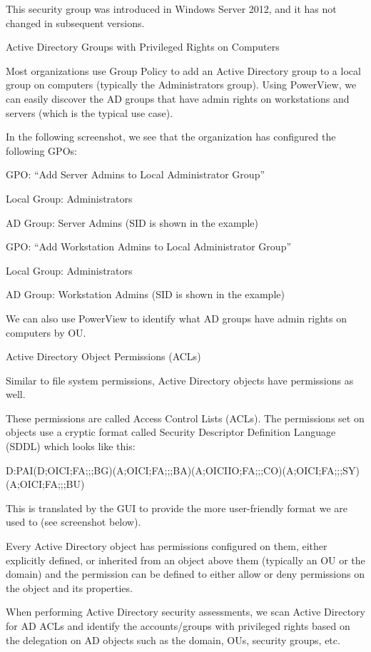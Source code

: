This security group was introduced in Windows Server 2012, and it has not changed in subsequent versions.

Active Directory Groups with Privileged Rights on Computers

Most organizations use Group Policy to add an Active Directory group to a local group on computers (typically the Administrators group). Using PowerView, we can easily discover the AD groups that have admin rights on workstations and servers (which is the typical use case).

In the following screenshot, we see that the organization has configured the following GPOs:

GPO: “Add Server Admins to Local Administrator Group”

Local Group: Administrators

AD Group: Server Admins (SID is shown in the example)

GPO: “Add Workstation Admins to Local Administrator Group”

Local Group: Administrators

AD Group: Workstation Admins (SID is shown in the example)

We can also use PowerView to identify what AD groups have admin rights on computers by OU.

Active Directory Object Permissions (ACLs)

Similar to file system permissions, Active Directory objects have permissions as well.

These permissions are called Access Control Lists (ACLs). The permissions set on objects use a cryptic format called Security Descriptor Definition Language (SDDL) which looks like this:

D:PAI(D;OICI;FA;;;BG)(A;OICI;FA;;;BA)(A;OICIIO;FA;;;CO)(A;OICI;FA;;;SY)(A;OICI;FA;;;BU)

This is translated by the GUI to provide the more user-friendly format we are used to (see screenshot below).

Every Active Directory object has permissions configured on them, either explicitly defined, or inherited from an object above them (typically an OU or the domain) and the permission can be defined to either allow or deny permissions on the object and its properties.

When performing Active Directory security assessments, we scan Active Directory for AD ACLs and identify the accounts/groups with privileged rights based on the delegation on AD objects such as the domain, OUs, security groups, etc.

